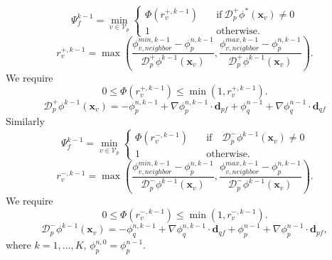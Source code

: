 \documentclass{article}
\begin{document}
\begin{equation}
	\Psi_{f}^{k-1} = \min_{v \in \mathcal{V}_p}
	\begin{cases}
		\Phi(r_{v}^{+,k-1}) \quad
		&\text{if} \ \mathcal{D}^+_{p}\phi^{*}(\boldsymbol{x}_v)
		\neq 0\\
		1 \quad &\text{otherwise}.
	\end{cases}
\end{equation}
\[
	r_{v}^{+,k-1} =
	\max \left(
		\frac{\phi_{v, neighbor}^{min,k-1} -\phi_p^{n,k-1}}{\mathcal{D}^+_{p}\phi^{k-1}(\boldsymbol{x}_v)},
		\frac{\phi_{v, neighbor}^{max,k-1} -\phi_p^{n,k-1}}{\mathcal{D}^+_{p}\phi^{k-1}(\boldsymbol{x}_v)}
		\right).
\]
We require
\[
	0 \leq \Phi(r_{v}^{+,k-1}) \leq \min(1, r_{v}^{+,k-1}).
\]
\[
	\mathcal{D}^+_{p}\phi^{k-1}(\boldsymbol{x}_v) =
	-\phi_p^{n,k-1} + \nabla\phi_p^{n,k-1}\cdot\boldsymbol{d}_{pf} +
	\phi_q^{n-1} + \nabla\phi_q^{n-1}\cdot\boldsymbol{d}_{qf}
\]
Similarly
\begin{equation}
	\Psi_{f}^{k-1} = \min_{v \in \mathcal{V}_p}
	\begin{cases}
		\Phi(r_{v}^{-,k-1}) \quad
		&\text{if} \quad \mathcal{D}^-_p\phi^{k-1}(\boldsymbol{x}_v)
		\neq 0\\
		1 \quad &\text{otherwise}.
	\end{cases}
\end{equation}
\[
	r_{v}^{-,k-1} =
	\max \left(
	\frac{\phi_{v, neighbor}^{min,k-1} -\phi_p^{n,k-1}}{\mathcal{D}^-_p\phi^{k-1}(\boldsymbol{x}_v)},
	\frac{\phi_{v, neighbor}^{max,k-1} -\phi_p^{n,k-1}}{\mathcal{D}^-_p\phi^{k-1}(\boldsymbol{x}_v)}
	\right).
\]
We require
\[
	0
	\leq
	\Phi(r_{v}^{-,k-1})
	\leq
	\min(1, r_{v}^{-,k-1}).
\]
\[
	\mathcal{D}^-_p\phi^{k-1}(\boldsymbol{x}_v) =
	-\phi_q^{n,k-1} + \nabla\phi_q^{n,k-1}\cdot\boldsymbol{d}_{qf} +
	\phi_p^{n-1} + \nabla\phi_p^{n-1}\cdot\boldsymbol{d}_{pf},
\]
where $ k = 1,\dots, K $, $ \phi_p^{n, 0} = \phi_p^{n-1}. $
\end{document}

